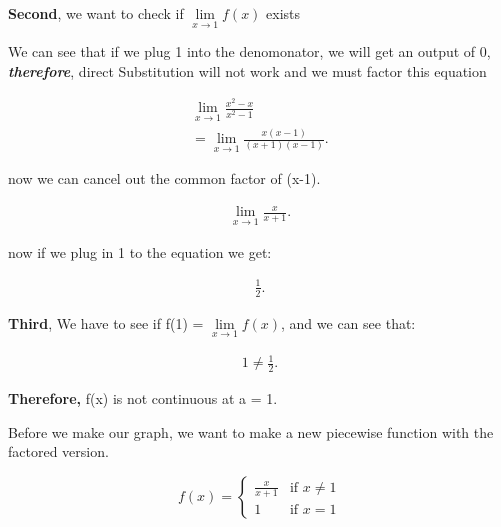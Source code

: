 \documentclass{report}
\begin{document}
        \bigbreak \noindent 
        \textbf{Second}, we want to check if $\lim\limits_{x \to 1}{f \left(x\right)}$ exists

        \bigbreak \noindent 
        We can see that if we plug 1 into the denomonator, we will get an output of 0, 
        \textbf{\textit{therefore}}, direct Substitution will not work and we must factor this
        equation 

        \begin{align*}
            \lim\limits_{x \to 1}{ \frac{x^2-x}{x^2-1}} \\ 
            = \lim\limits_{x \to 1}{ \frac{x \left(x - 1\right)}{ \left(x+1\right) \left(x-1\right)}}
        .\end{align*}

        \bigbreak \noindent 
        now we can cancel out the common factor of (x-1).

        \begin{align*}
            \lim\limits_{x \to 1}{ \frac{x}{x+1}}
        .\end{align*}

        \bigbreak \noindent 
        now if we plug in 1 to the equation we get:

        \begin{align*}
            \frac{1}{2}
        .\end{align*}

        \bigbreak \noindent 
        \textbf{Third}, We have to see if f(1) = $\lim\limits_{x \to 1}{f \left(x\right)}$, and
        we can see that:

        \begin{align*}
            1 \neq \frac{1}{2}
        .\end{align*}

        \bigbreak \noindent 
        \textbf{Therefore,} f(x) is not continuous at a = 1.

        \bigbreak \noindent 
        Before we make our graph, we want to make a new piecewise function with the factored version.

           \begin{equation}
            f \left(x\right)=
                \begin{cases}
                    \frac{x}{x+1} & \text{if } x \neq 1 \\
                    1 & \text{if } x = 1 
                \end{cases}
            \end{equation}
\end{document}
